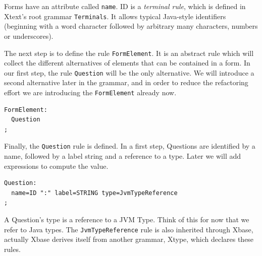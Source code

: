 Forms have an attribute called \texttt{name}. ID is a \emph{terminal rule},
which is defined in Xtext's root grammar \texttt{Terminals}. It allows typical
Java-style identifiers (beginning with a word character followed by arbitrary many characters,
numbers or underscores).

The next step is to define the rule \texttt{FormElement}. It is an abstract rule which
will collect the different alternatives of elements that can be contained in a
form. In our first step, the rule \texttt{Question} will be the only alternative. We will
introduce a second alternative later in the grammar, and in order to reduce the
refactoring effort we are introducing the \texttt{FormElement} already now.

\begin{lstlisting}[language=Xtext]
FormElement:
  Question
;
\end{lstlisting}

Finally, the \texttt{Question} rule is defined. In a first step, Questions are identified
by a name, followed by a label string and a reference to a type. Later we will
add expressions to compute the value.

\begin{lstlisting}[language=Xtext]
Question:
  name=ID ":" label=STRING type=JvmTypeReference
;
\end{lstlisting}

A Question's type is a reference to a JVM Type. Think of this for now that we
refer to Java types. The \texttt{JvmTypeReference} rule is also inherited through Xbase,
actually Xbase derives itself from another grammar, Xtype, which declares these
rules.


